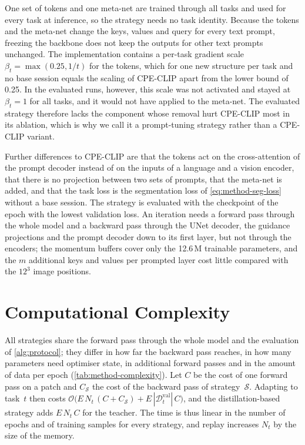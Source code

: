 One set of tokens and one meta-net are trained through all tasks and used for every task at inference, so the strategy needs no task identity.
Because the tokens and the meta-net change the keys, values and query for every text prompt, freezing the backbone does not keep the outputs for other text prompts unchanged.
The implementation contains a per-task gradient scale $\beta_t = \max(0.25, 1/t)$ for the tokens, which for one new structure per task and no base session equals the scaling of CPE-CLIP apart from the lower bound of 0.25.
In the evaluated runs, however, this scale was not activated and stayed at $\beta_t = 1$ for all tasks, and it would not have applied to the meta-net.
The evaluated strategy therefore lacks the component whose removal hurt CPE-CLIP most in its ablation, which is why we call it a prompt-tuning strategy rather than a CPE-CLIP variant.

Further differences to CPE-CLIP are that the tokens act on the cross-attention of the prompt decoder instead of on the inputs of a language and a vision encoder, that there is no projection between two sets of prompts, that the meta-net is added, and that the task loss is the segmentation loss of \cref{eq:method-seg-loss} without a base session.
The strategy is evaluated with the checkpoint of the epoch with the lowest validation loss.
An iteration needs a forward pass through the whole model and a backward pass through the UNet decoder, the guidance projections and the prompt decoder down to its first layer, but not through the encoders; the momentum buffers cover only the 12.6\,M trainable parameters, and the $m$ additional keys and values per prompted layer cost little compared with the $12^3$ image positions.

\section{Computational Complexity}
\label{sec:method-complexity}

All strategies share the forward pass through the whole model and the evaluation of \cref{alg:protocol}; they differ in how far the backward pass reaches, in how many parameters need optimiser state, in additional forward passes and in the amount of data per epoch (\cref{tab:method-complexity}).
Let $C$ be the cost of one forward pass on a patch and $C_{\mathcal{S}}$ the cost of the backward pass of strategy~$\mathcal{S}$.
Adapting to task~$t$ then costs $\mathcal{O}\big(E \, N_t \, (C + C_{\mathcal{S}}) + E \, |\mathcal{D}_t^{\mathrm{val}}| \, C\big)$, and the distillation-based strategy adds $E \, N_t \, C$ for the teacher.
The time is thus linear in the number of epochs and of training samples for every strategy, and replay increases $N_t$ by the size of the memory.

